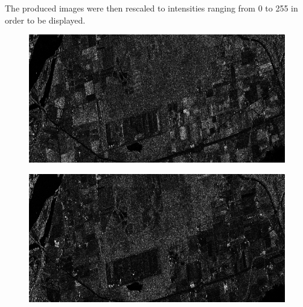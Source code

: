 The produced images were then rescaled to intensities ranging from 0 to 255 in order to be displayed.


\begin{center}
  \begin{figure}[h!]
    \includegraphics[width=\textwidth]{../Art/test-left-co-2.png}
    \label{fig:polsynthll}
   \end{figure}
   
   \begin{figure}[h!]
    \includegraphics[width=\textwidth]{../Art/test-left-cross-2.png}
    \label{fig:polsynthlr}
   \end{figure}
\end{center}
